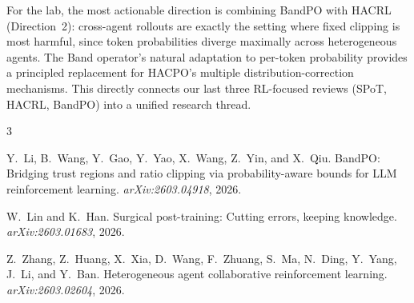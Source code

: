 \documentclass[11pt]{article}
\begin{document}
For the lab, the most actionable direction is combining BandPO with HACRL (Direction~2): cross-agent rollouts are exactly the setting where fixed clipping is most harmful, since token probabilities diverge maximally across heterogeneous agents. The Band operator's natural adaptation to per-token probability provides a principled replacement for HACPO's multiple distribution-correction mechanisms. This directly connects our last three RL-focused reviews (SPoT, HACRL, BandPO) into a unified research thread.


\begin{thebibliography}{3}

Y.~Li, B.~Wang, Y.~Gao, Y.~Yao, X.~Wang, Z.~Yin, and X.~Qiu.
\newblock BandPO: Bridging trust regions and ratio clipping via probability-aware bounds for LLM reinforcement learning.
\newblock \emph{arXiv:2603.04918}, 2026.

W.~Lin and K.~Han.
\newblock Surgical post-training: Cutting errors, keeping knowledge.
\newblock \emph{arXiv:2603.01683}, 2026.

Z.~Zhang, Z.~Huang, X.~Xia, D.~Wang, F.~Zhuang, S.~Ma, N.~Ding, Y.~Yang, J.~Li, and Y.~Ban.
\newblock Heterogeneous agent collaborative reinforcement learning.
\newblock \emph{arXiv:2603.02604}, 2026.

\end{thebibliography}
\end{document}
